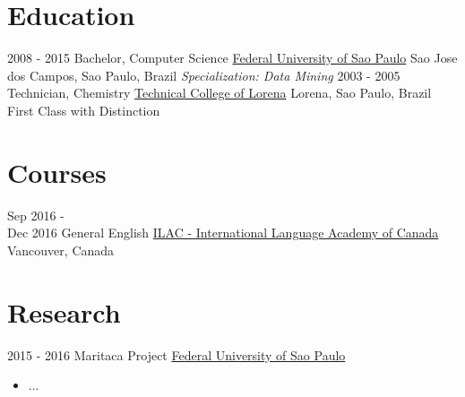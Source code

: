 \documentclass[letterpaper]{twentysecondcv} %
\begin{document}
\makeprofile %

\section{Education}

\begin{twenty} %
	\twentyitem
    	{2008 - 2015}
        {Bachelor, Computer Science}
        {\href{http://www.unifesp.br/}{Federal University of Sao Paulo}}
        {Sao Jose dos Campos, Sao Paulo, Brazil}
        {  \textit{Specialization: Data Mining}}
	\twentyitem
    	{2003 - 2005}
        {Technician, Chemistry}
        {\href{http://www.cotel.eel.usp.br//}{Technical College of Lorena}}
        {Lorena, Sao Paulo, Brazil}
        {First Class with Distinction}
\end{twenty}


\section{Courses}

\begin{twenty} %
	\twentyitem
    	{Sep 2016 - \\Dec 2016}
        {General English}
        {\href{http://www.ilac.com/}{ILAC - International Language Academy of Canada}}
        {Vancouver, Canada}
        {}
\end{twenty}



\section{Research}
\begin{twenty}
	\twentyitem
    	{2015 - 2016}
        {Maritaca Project}
        {\href{http://www.uoguelph.ca/}{Federal University of Sao Paulo}}
        {}
        {
        {\begin{itemize}
        \item ...
    \end{itemize}}
        }
\end{twenty}
\end{document}

